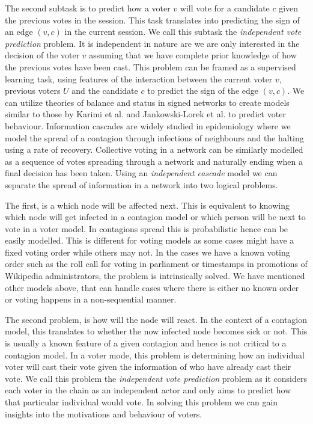 The second subtask is to predict how a voter $v$ will vote for a candidate $c$ given the previous votes in the session. This task translates into predicting the sign of an edge $(v,c)$ in the current session. We call this subtask the \textit{independent vote prediction} problem. It is independent in nature are we are only interested in the decision of the voter $v$ assuming that we have complete prior knowledge of how the previous votes have been cast. This problem can be framed as a supervised learning task, using features of the interaction between the current voter $v$, previous voters $U$ and the candidate $c$ to predict the sign of the edge $(v,c)$. We can utilize theories of balance and status in signed networks to create models similar to those by Karimi et al. \cite{karimi2019multicongress} and Jankowski-Lorek et al. \cite{jankowski-lorek2013MBSN} to predict voter behaviour.
\iffalse
{}
Information cascades are widely studied in epidemiology where we model the spread of a contagion through infections of neighbours and the halting using a rate of recovery. Collective voting in a network can be similarly modelled as a sequence of votes spreading through a network and naturally ending when a final decision has been taken. Using an \textit{independent cascade} model we can separate the spread of information in a network into two logical problems.

The first, is a which node will be affected next. This is equivalent to knowing which node will get infected in a contagion model or which person will be next to vote in a voter model. In contagions spread this is probabilistic hence can be easily modelled. This is different for voting models as some cases might have a fixed voting order while others may not. In the cases we have a known voting order such as the roll call for voting in parliament or timestamps in promotions of Wikipedia administrators, the problem is intrinsically solved. We have mentioned other models above, that can handle cases where there is either no known order or voting happens in a non-sequential manner. 

The second problem, is how will the node will react. In the context of a contagion model, this translates to whether the now infected node becomes sick or not. This is usually a known feature of a given contagion and hence is not critical to a contagion model. In a voter mode, this problem is determining how an individual voter will cast their vote given the information of who have already cast their vote. We call this problem the \textit{independent vote prediction} problem as it considers each voter in the chain as an independent actor and only aims to predict how that particular individual would vote. In solving this problem we can gain insights into the motivations and behaviour of voters. 

